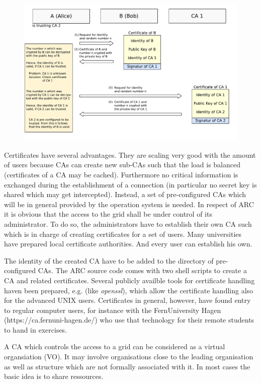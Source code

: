 \begin{figure}[htb]
	\centering%
	\includegraphics[width=13cm]{tex_tls_echoservice/verification.pdf}
	\label{fig:verification_of_certificates}
\end{figure}

Certificates have several advantages.
They are scaling very good with the amount of users because CAs can create new sub-CAs such that the load is balanced (certificates of a CA may be cached).
Furthermore no critical information is exchanged during the establishment of a connection (in particular no secret key is shared which may get intercepted).
Instead, a set of pre-configured CAs which will be in general provided by the operation system is needed.
In respect of ARC it is obvious that the access to the grid shall be under control of its administrator.
To do so, the administrators have to establish their own CA such which is in charge of creating certificates for a set of users.
Many universities have prepared local certificate authorities.
And every user can establish his own. 

The identity of the created CA have to be added to the directory of pre-configured CAs.
The ARC source code comes with two shell scripts to create a CA and related certificates.
Several publicly availble tools for certificate handling haven been prepared, e.g. (like \textit{openssl}),
which allow the certificate handling also for the advanced UNIX users.
Certificates in general, however, have found entry to regular computer users, for instance with the FernUniversity Hagen (https://ca.fernuni-hagen.de/) who use that technology for their remote students to hand in exercises.

A CA which controls the access to a grid can be considered as a virtual organsiation (VO).
It may involve organisations close to the leading organisation as well as structure which are not formally associated with it.
In most cases the basic idea is to share ressources. 

